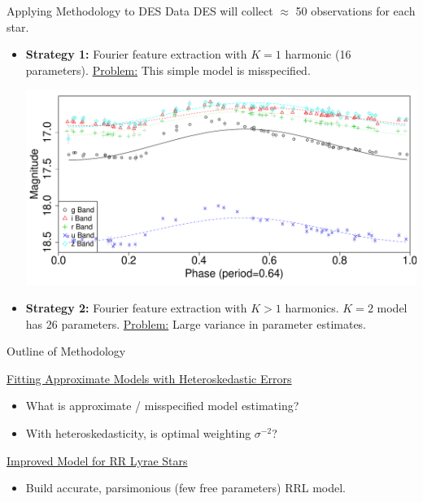 \documentclass[12pt]{beamer}
\begin{document}
\begin{frame}{Applying Methodology to DES Data}
  DES will collect $\approx$ 50 observations for each star.

  \begin{itemize}
    \item \textbf{Strategy 1:} Fourier feature extraction with $K=1$ harmonic (16 parameters). \underline{Problem:} This simple model is misspecified.

  \begin{center}
    \includegraphics[scale=.25]{figs/rrlyrae_model_fit_sine.pdf}
  \end{center}

\item \textbf{Strategy 2:} Fourier feature extraction with $K>1$ harmonics. $K=2$ model has 26 parameters. \underline{Problem:} Large variance in parameter estimates.
  \end{itemize}
\end{frame}


\begin{frame}{Outline of Methodology}

\underline{Fitting Approximate Models with Heteroskedastic Errors}\\
\begin{itemize}
\item What is approximate / misspecified model estimating?
\item With heteroskedasticity, is optimal weighting $\sigma^{-2}$?
\end{itemize}


\vspace{.2in}

\underline{Improved Model for RR Lyrae Stars}
\begin{itemize}
\item Build accurate, parsimonious (few free parameters) RRL model.
\end{itemize}

\end{frame}
\end{document}
